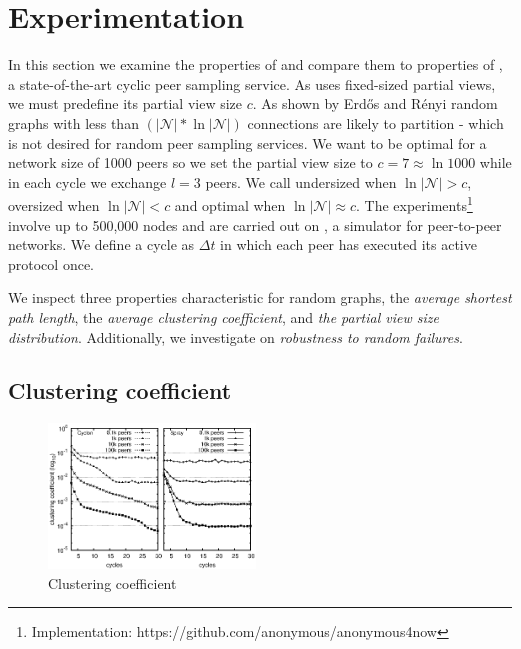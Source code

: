 \section{Experimentation}
\label{sec:experiments}
In this section we examine the properties of \SCAMPLON{} and 
compare them to properties of \CYCLON{}, a state-of-the-art cyclic peer sampling service.
As \CYCLON{} uses fixed-sized partial views, we must predefine its partial view size $c$.
As shown by Erd{\H o}s and R{\' e}nyi\cite{erdos1959random} random graphs with less than 
$(|\mathcal{N}|*\ln|\mathcal{N}|)$ connections are likely to partition - 
which is not desired for random peer sampling services.
We want \CYCLON{} to be optimal for a network size of 1000 peers so we set the partial view size 
to $c=7\approx \ln{1000}$ while in each cycle we exchange $l=3$ peers.
We call \CYCLON{} 
undersized when $\ln{|\mathcal{N}}| > c$, 
oversized when $\ln{|\mathcal{N}|} < c$ and 
optimal when $\ln{|\mathcal{N}|} \approx c$.
The experiments\footnote{Implementation: https://github.com/anonymous/anonymous4now}
involve up to 500,000 nodes and are carried out on \PEERSIM{} \cite{peersim}, 
a simulator for peer-to-peer networks.
We define a cycle as $\Delta t$ in which each peer has executed its active protocol once.

We inspect three properties characteristic for random graphs, 
the \emph{average shortest path length}, the \emph{average clustering coefficient},
and \emph{the partial view size distribution}. Additionally, we investigate on
\emph{robustness to random failures}.

\subsection{Clustering coefficient}

\begin{figure}
    \centering
    \includegraphics[width=0.49\textwidth]{img/cluster.eps}
    \caption{Clustering coefficient}
    \label{fig:clustering}
\end{figure}


